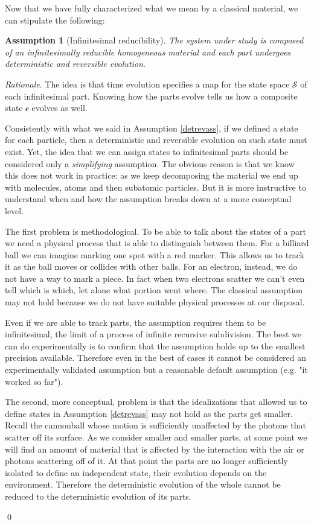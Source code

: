 \documentclass[aps,pra,10pt,twocolumn,floatfix,nofootinbib]{revtex4-1}
\numberwithin{equation}{section}
\newtheorem{assump}{Assumption}
\theoremstyle{definition}
\newenvironment{rationale}{\emph{Rationale}.}{\qed}
\begin{document}
Now that we have fully characterized what we mean by a classical material, we can stipulate the following:

\begin{assump}[Infinitesimal reducibility]\label{infinitesimal_reducibility}
	The system under study is composed of an infinitesimally reducible homogeneous material and each part undergoes deterministic and reversible evolution.
\end{assump}

\begin{rationale}
	The idea is that time evolution specifies a map for the state space $\mathcal{S}$ of each infinitesimal part. Knowing how the parts evolve tells us how a composite state $\mathcal{c}$ evolves as well.
	
	Consistently with what we said in Assumption \ref{detrevass}, if we defined a state for each particle, then a deterministic and reversible evolution on such state must exist. Yet, the idea that we can assign states to infinitesimal parts should be considered only a \emph{simplifying} assumption. The obvious reason is that we know this does not work in practice: as we keep decomposing the material we end up with molecules, atoms and then subatomic particles. But it is more instructive to understand when and how the assumption breaks down at a more conceptual level.
	
	The first problem is methodological. To be able to talk about the states of a part we need a physical process that is able to distinguish between them. For a billiard ball we can imagine marking one spot with a red marker. This allows us to track it as the ball moves or collides with other balls. For an electron, instead, we do not have a way to mark a piece. In fact when two electrons scatter we can't even tell which is which, let alone what portion went where. The classical assumption may not hold because we do not have suitable physical processes at our disposal.
	
    Even if we are able to track parts, the assumption requires them to be infinitesimal, the limit of a process of infinite recursive subdivision. The best we can do experimentally is to confirm that the assumption holds up to the smallest precision available. Therefore even in the best of cases it cannot be considered an experimentally validated assumption but a reasonable default assumption (e.g. "it worked so far").
	
	The second, more conceptual, problem is that the idealizations that allowed us to define states in Assumption \ref{detrevass} may not hold as the parts get smaller. Recall the cannonball whose motion is sufficiently unaffected by the photons that scatter off its surface. As we consider smaller and smaller parts, at some point we will find an amount of material that is affected by the interaction with the air or photons scattering off of it. At that point the parts are no longer sufficiently isolated to define an independent state, their evolution depends on the environment. Therefore the deterministic evolution of the whole cannot be reduced to the deterministic evolution of its parts.
	

\end{rationale}
\end{document}
